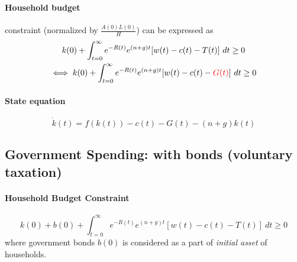 \documentclass[11pt]{article}
\begin{document}
			\paragraph{Household budget} constraint (normalized by $\frac{A(0)L(0)}{H}$) can be expressed as
			\begin{gather}
				k(0) + \int_{t=0}^\infty {e^{-R(t)} e^{(n+g)t} [w(t) - c(t) - T(t)]}\ dt \geq 0 \\
				\iff k(0) + \int_{t=0}^\infty {e^{-R(t)} e^{(n+g)t} [w(t) - c(t) - \textcolor{red}{G(t)}]}\ dt \geq 0
			\end{gather}
			
			\paragraph{State equation} 
			\begin{equation}
				\dot{k}(t) = f(k(t)) - c(t) - G(t) - (n+g)k(t)
			\end{equation}
		
		\subsection{Government Spending: with bonds (voluntary taxation)}
			\paragraph{Household Budget Constraint}
				\begin{equation}
					k(0) + b(0) + \int_{t=0}^\infty {e^{-R(t)} e^{(n+g)t} [w(t) - c(t) - T(t)]}\ dt \geq 0
				\end{equation}
				where government bonds $b(0)$ is considered as a part of \emph{initial asset} of households.
\end{document}
